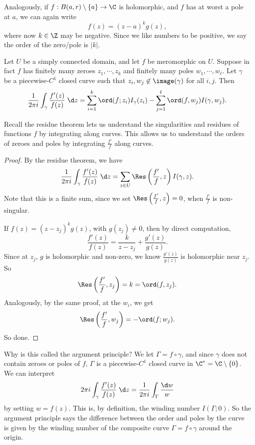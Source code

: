 \documentclass[a4paper]{article}
\begin{document}
Analogously, if $f: B(a, r) \setminus \{a\} \to \C$ is holomorphic, and $f$ has at worst a pole at $a$, we can again write
\[
  f(z) = (z - a)^k g(z),
\]
where now $k \in \Z$ may be negative. Since we like numbers to be positive, we say the order of the zero/pole is $|k|$.

\begin{thm}
  Let $U$ be a simply connected domain, and let $f$ be meromorphic on $U$. Suppose in fact $f$ has finitely many zeroes $z_1, \cdots, z_k$ and finitely many poles $w_1, \cdots, w_\ell$. Let $\gamma$ be a piecewise-$C^1$ closed curve such that $z_i, w_j \not\in \image(\gamma)$ for all $i, j$. Then
  \[
    \frac{1}{2\pi i}\int_\gamma \frac{f'(z)}{f(z)}\;\d z = \sum_{i = 1}^k \ord(f; z_i) I_\gamma(z_i) - \sum_{j = 1}^\ell \ord(f, w_j) I(\gamma, w_j).
  \]
\end{thm}
Recall the residue theorem lets us understand the singularities and residues of functions $f$ by integrating along curves. This allows us to understand the orders of zeroes and poles by integrating $\frac{f'}{f}$ along curves.

\begin{proof}
  By the residue theorem, we have
  \[
    \frac{1}{2\pi i}\int_\gamma \frac{f'(z)}{f(z)}\;\d z = \sum_{z \in U} \Res\left(\frac{f'}{f}, z\right) I(\gamma, z).
  \]
  Note that this is a finite sum, since we set $\Res\left(\frac{f'}{f}, z\right) = 0$, when $\frac{f'}{f}$ is non-singular.

  If $f(z) = (z - z_j)^k g(z)$, with $g(z_j) \not= 0$, then by direct computation,
  \[
    \frac{f'(z)}{f(z)} = \frac{k}{z - z_j} + \frac{g'(z)}{g(z)}.
  \]
  Since at $z_j$, $g$ is holomorphic and non-zero, we know $\frac{g'(z)}{g(z)}$ is holomorphic near $z_j$. So
  \[
    \Res\left(\frac{f'}{f}, z_j\right) = k = \ord(f, z_j).
  \]
  Analogously, by the same proof, at the $w_i$, we get
  \[
    \Res\left(\frac{f'}{f}, w_j\right) = -\ord(f; w_j).
  \]
  So done.
\end{proof}
Why is this called the argument principle? We let $\Gamma = f \circ \gamma$, and since $\gamma$ does not contain zeroes or poles of $f$, $\Gamma$ is a piecewise-$C^1$ closed curve in $\C^* = \C \setminus\{0\}$. We can interpret
\[
  2\pi i\int_\gamma \frac{f'(z)}{f(z)}\;\d z = \frac{1}{2\pi i} \int_\Gamma \frac{\d w}{w}
\]
by setting $w = f(z)$. This is, by definition, the winding number $I(\Gamma; 0)$. So the argument principle says the difference between the order and poles by the curve is given by the winding number of the composite curve $\Gamma = f \circ \gamma$ around the origin.
\end{document}
